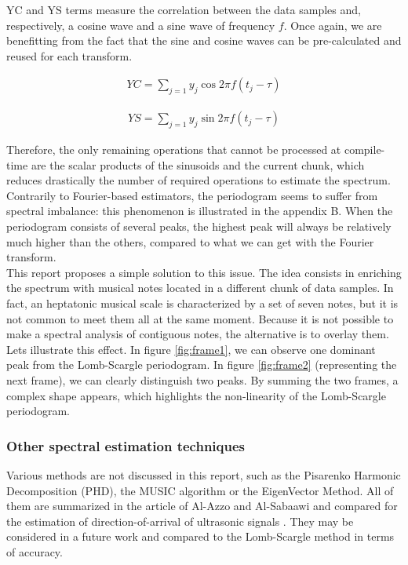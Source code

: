 \documentclass[letterpaper]{article}
\begin{document}
YC and YS terms measure the correlation between the data samples and, respectively, a cosine wave and a sine wave of frequency $f$. Once again, we are
benefitting from the fact that the sine and cosine waves can be pre-calculated and reused for each transform.

\begin{align}
YC = \sum\limits_{j=1} y_{j}\cos 2\pi f (t_{j} - \tau)
\end{align}

\begin{align}
YS = \sum\limits_{j=1} y_{j}\sin 2\pi f (t_{j} - \tau)
\end{align}

Therefore, the only remaining operations that cannot be processed at compile-time are the scalar products of the sinusoids and the current chunk, which
reduces drastically the number of required operations to estimate the spectrum.\\

Contrarily to Fourier-based
estimators, the periodogram seems to suffer from spectral imbalance: this phenomenon is illustrated in the appendix B. When the periodogram consists of several peaks, the highest peak will always be relatively much higher than the others, compared to what we can get with the Fourier transform.\\

This report proposes a simple solution to this issue. The idea consists in enriching the spectrum with musical notes located in a different chunk of data samples. In fact, an heptatonic musical scale is characterized by a set of seven notes, but it is
not common to meet them all at the same moment. Because it is not possible to make a spectral analysis of contiguous notes, the alternative is to overlay them.
Let\textquotesingle s illustrate this effect. In figure \ref{fig:frame1}, 
we can observe one dominant peak from the Lomb-Scargle periodogram. In figure \ref{fig:frame2} (representing the next frame), we can clearly distinguish two peaks. By summing the two frames, a complex shape appears, which highlights the non-linearity of the Lomb-Scargle periodogram.\\

\subsubsection{Other spectral estimation techniques}

Various methods are not discussed in this report, such as the Pisarenko Harmonic Decomposition (PHD), the MUSIC algorithm or the EigenVector Method. All of them are summarized in the article of Al-Azzo and Al-Sabaawi and compared for the estimation of direction-of-arrival of ultrasonic signals \citep{MA}. They may be considered in a future work and compared to the Lomb-Scargle method in terms of accuracy.
\end{document}
